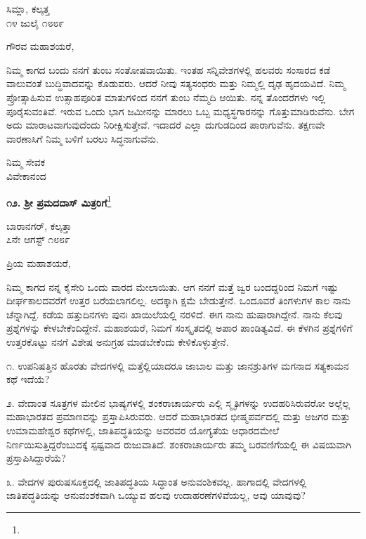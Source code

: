 \begin{flushright}
ಸಿಮ್ಲಾ, ಕಲ್ಕತ್ತ\\೧೪ ಜುಲೈ ೧೮೮೯
\end{flushright}

\noindent
ಗೌರವ ಮಹಾಶಯರೆ,

ನಿಮ್ಮ ಕಾಗದ ಬಂದು ನನಗೆ ತುಂಬ ಸಂತೋಷವಾಯಿತು. ಇಂತಹ ಸನ್ನಿವೇಶಗಳಲ್ಲಿ ಹಲವರು ಸಂಸಾರದ ಕಡೆ ವಾಲುವಂತೆ ಬುದ್ಧಿವಾದವನ್ನು ಕೊಡುವರು. ಆದರೆ ನೀವು ಸತ್ಯಸಂಧರು ಮತ್ತು ನಿಮ್ಮಲ್ಲಿ ದೃಢ ಹೃದಯವಿದೆ. ನಿಮ್ಮ ಪ್ರೋತ್ಸಾಹಿಸುವ ಉತ್ಸಾಹಪೂರಿತ ಮಾತುಗಳಿಂದ ನನಗೆ ತುಂಬ ನೆಮ್ಮದಿ ಆಯಿತು. ನನ್ನ ತೊಂದರೆಗಳು ಇಲ್ಲಿ ಪೂರೈಸುವಂತಿವೆ. ಇರುವ ಒಂದು ಭಾಗ ಜಮೀನನ್ನು ಮಾರಲು ಒಬ್ಬ ಮಧ್ಯಸ್ಥಗಾರನನ್ನು ಗೊತ್ತುಮಾಡಿರುವೆನು. ಬೇಗ ಅದು ಮಾರಾಟವಾಗುವುದೆಂದು ನಿರೀಕ್ಷಿಸುತ್ತೇವೆ. ಇದಾದರೆ ಎಲ್ಲಾ ದುಗುಡದಿಂದ ಪಾರಾಗುವೆನು. ತಕ್ಷಣವೇ ವಾರಣಾಸಿಗೆ ನಿಮ್ಮ ಬಳಿಗೆ ಬರಲು ಸಿದ್ಧನಾಗುವೆನು.

{\flushright
ನಿಮ್ಮ ಸೇವಕ\\ವಿವೇಕಾನಂದ\par}
\vfill 
\eject

\begin{center}
\textbf{೧೨. ಶ‍್ರೀ ಪ್ರಮದದಾಸ್ ಮಿತ್ರರಿಗೆ}\footnote{}
\end{center}

\begin{flushright}
ಬಾರಾನಗರ್, ಕಲ್ಕತ್ತಾ\\೭ನೇ ಆಗಸ್ಟ್ ೧೮೮೯
\end{flushright}

\noindent
ಪ್ರಿಯ ಮಹಾಶಯರೆ,

ನಿಮ್ಮ ಕಾಗದ ನನ್ನ ಕೈಸೇರಿ ಒಂದು ವಾರದ ಮೇಲಾಯಿತು. ಆಗ ನನಗೆ ಮತ್ತೆ ಜ್ವರ ಬಂದದ್ದರಿಂದ ನಿಮಗೆ ಇಷ್ಟು ದೀರ್ಘಕಾಲದವರೆಗೆ ಉತ್ತರ ಬರೆಯಲಾಗಲಿಲ್ಲ. ಅದಕ್ಕಾಗಿ ಕ್ಷಮೆ ಬೇಡುತ್ತೇನೆ. ಒಂದೂವರೆ ತಿಂಗಳುಗಳ ಕಾಲ ನಾನು ಚೆನ್ನಾಗಿದ್ದೆ. ಕಡೆಯ ಹತ್ತುದಿನಗಳು ಪುನಃ ಖಾಯಿಲೆಯಲ್ಲಿ ನರಳಿದೆ. ಈಗ ನಾನು ಹುಷಾರಾಗಿದ್ದೇನೆ. ನಾನು ಕೆಲವು ಪ್ರಶ್ನೆಗಳನ್ನು ಕೇಳಬೇಕೆಂದಿದ್ದೇನೆ. ಮಹಾಶಯರೆ, ನಿಮಗೆ ಸಂಸ್ಕೃತದಲ್ಲಿ ಅಪಾರ ಪಾಂಡಿತ್ಯವಿದೆ. ಈ ಕೆಳಗಿನ ಪ್ರಶ್ನೆಗಳಿಗೆ ಉತ್ತರಕೊಟ್ಟು ನನಗೆ ವಿಶೇಷ ಅನುಗ್ರಹ ಮಾಡಬೇಕೆಂದು ಕೇಳಿಕೊಳ್ಳುತ್ತೇನೆ.

೧. ಉಪನಿಷತ್ತಿನ ಹೊರತು ವೇದಗಳಲ್ಲಿ ಮತ್ತೆಲ್ಲಿಯಾದರೂ ಜಾಬಾಲ ಮತ್ತು ಜಾನಶ್ರುತಿಗಳ ಮಗನಾದ ಸತ್ಯಕಾಮನ ಕಥೆ ಇದೆಯೆ?

೨. ವೇದಾಂತ ಸೂತ್ರಗಳ ಮೇಲಿನ ಭಾಷ್ಯಗಳಲ್ಲಿ ಶಂಕರಾಚಾರ್ಯರು ಎಲ್ಲಿ ಸ್ಮೃತಿಗಳನ್ನು ಉದಹರಿಸಿರುವರೋ ಅಲ್ಲೆಲ್ಲ ಮಹಾಭಾರತದ ಪ್ರಮಾಣವನ್ನು ಪ್ರಸ್ತಾಪಿಸಿರುವರು. ಆದರೆ ಮಹಾಭಾರತದ ಭೀಷ್ಮಪರ್ವದಲ್ಲಿ ಮತ್ತು ಅಜಗರ ಮತ್ತು ಉಮಾಮ\-ಹೇಶ್ವರ ಕಥೆಗಳಲ್ಲಿ, ಜಾತಿಪದ್ಧತಿಯನ್ನು ಅವರವರ ಯೋಗ್ಯತೆಯ ಆಧಾರದಮೇಲೆ ನಿರ್ಣಯಿಸುತ್ತಿದ್ದರೆಂಬುದಕ್ಕೆ ಸ್ಪಷ್ಟವಾದ ರುಜುವಾತಿದೆ. ಶಂಕರಾಚಾರ್ಯರು ತಮ್ಮ ಬರವಣಿಗೆಯಲ್ಲಿ ಈ ವಿಷಯವಾಗಿ ಪ್ರಸ್ತಾಪಿಸಿದ್ದಾರೆಯೆ?

೩. ವೇದಗಳ ಪುರುಷಸೂಕ್ತದಲ್ಲಿ ಜಾತಿಪದ್ಧತಿಯ ಸಿದ್ಧಾಂತ ಅನುವಂಶಿಕವಲ್ಲ. ಹಾಗಾದಲ್ಲಿ ವೇದಗಳಲ್ಲಿ ಜಾತಿಪದ್ಧತಿಯನ್ನು ಅನುವಂಶಕವಾಗಿ ಒಯ್ಯುವ ಹಲವು ಉದಾಹರಣೆಗಳಿವೆಯಲ್ಲ, ಅವು ಯಾವುವು?

